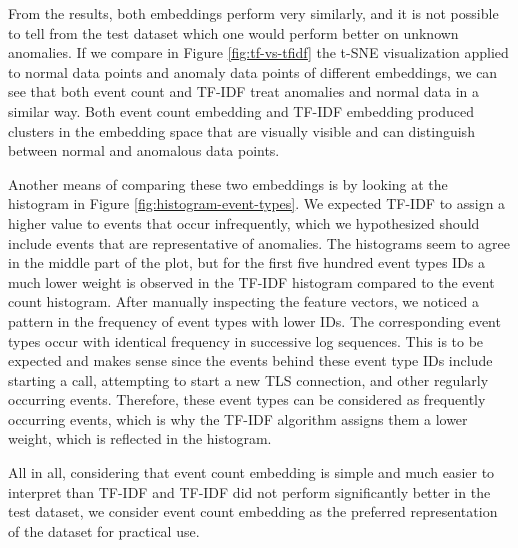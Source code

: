 From the results, both embeddings perform very similarly, and it is not possible to tell from the test dataset which one would perform better on unknown anomalies. If we compare in Figure \ref{fig:tf-vs-tfidf} the t-SNE visualization applied to normal data points and anomaly data points of different embeddings, we can see that both event count and TF-IDF treat anomalies and normal data in a similar way. Both event count embedding and TF-IDF embedding produced clusters in the embedding space that are visually visible and can distinguish between normal and anomalous data points.

Another means of comparing these two embeddings is by looking at the histogram in Figure \ref{fig:histogram-event-types}. We expected TF-IDF to assign a higher value to events that occur infrequently, which we hypothesized should include events that are representative of anomalies. The histograms seem to agree in the middle part of the plot, but for the first five hundred event types IDs a much lower weight is observed in the TF-IDF histogram compared to the event count histogram. After manually inspecting the feature vectors, we noticed a pattern in the frequency of event types with lower IDs. The corresponding event types occur with identical frequency in successive log sequences. This is to be expected and makes sense since the events behind these event type IDs include starting a call, attempting to start a new TLS connection, and other regularly occurring events. Therefore, these event types can be considered as frequently occurring events, which is why the TF-IDF algorithm assigns them a lower weight, which is reflected in the histogram.

All in all, considering that event count embedding is simple and much easier to interpret than TF-IDF and TF-IDF did not perform significantly better in the test dataset, we consider event count embedding as the preferred representation of the dataset for practical use.




